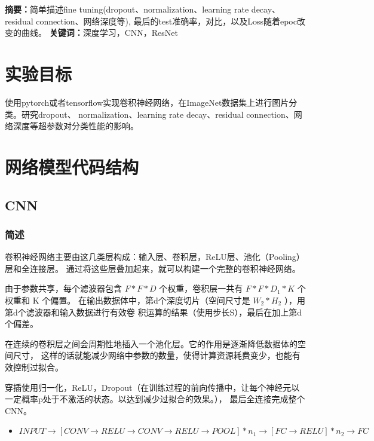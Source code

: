 \documentclass[a4paper,AutoFakeBold,AutoFakeSlant]{ctexart}
\title{\heiti{深度学习Lab1实验报告}}
\author{PB19151769~~~~~~马宇骁}
\makeatletter
\renewcommand{\abstractname}{}    %
\renewenvironment{abstract}{%
      \if@twocolumn
        \section*{\abstractname}%
      \else
        \small
        \begin{center}%
          {\bfseries \abstractname\vspace{-.5em}\vspace{\z@}}%
        \end{center}%
      \fi}
      {}
\makeatother
\begin{document}
\maketitle

\begin{abstract} \kaishu
\noindent 
\textbf{\heiti 摘要：}简单描述fine tuning(dropout、normalization、learning rate decay、residual 
connection、网络深度等), 最后的test准确率，对比，以及Loss随着epoc改变的曲线。
   \newline
\textbf{\heiti 关键词：}深度学习，CNN，ResNet
\end{abstract}


\section{实验目标}
使用pytorch或者tensorflow实现卷积神经网络，在ImageNet数据集上进行图片分类。研究dropout、
normalization、learning rate decay、residual connection、网络深度等超参数对分类性能的影响。



\section{网络模型代码结构}


\subsection{CNN}
\subsubsection{简述}
卷积神经网络主要由这几类层构成：输入层、卷积层，ReLU层、池化（Pooling）层和全连接层。
通过将这些层叠加起来，就可以构建一个完整的卷积神经网络。

由于参数共享，每个滤波器包含 $F*F*D$ 个权重，卷积层一共有 $F*F*D_1*K$ 个权重和 K 个偏置。
在输出数据体中，第d个深度切片（空间尺寸是 $W_2*H_2$ ），用第d个滤波器和输入数据进行有效卷
积运算的结果（使用步长S），最后在加上第d个偏差。

在连续的卷积层之间会周期性地插入一个池化层。它的作用是逐渐降低数据体的空间尺寸，
这样的话就能减少网络中参数的数量，使得计算资源耗费变少，也能有效控制过拟合。

穿插使用归一化，ReLU，Dropout（在训练过程的前向传播中，让每个神经元以一定概率p处于不激活的状态。以达到减少过拟合的效果。），
最后全连接完成整个CNN。
\begin{itemize}
  \item $ INPUT \rightarrow [CONV \rightarrow RELU \rightarrow CONV \rightarrow RELU \rightarrow POOL]*n_1 \rightarrow [FC \rightarrow RELU]*n_2 \rightarrow FC   $
\end{itemize}
\end{document}
